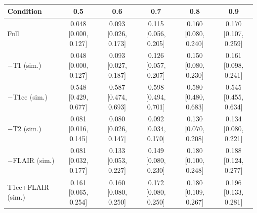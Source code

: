 \begin{tabular}{lccccc}
\toprule
Condition & 0.5 & 0.6 & 0.7 & 0.8 & 0.9 \\
\midrule
Full & 0.048 [0.000, 0.127] & 0.093 [0.026, 0.173] & 0.115 [0.056, 0.205] & 0.160 [0.080, 0.240] & 0.170 [0.107, 0.259] \\
$-$T1 (sim.) & 0.048 [0.000, 0.127] & 0.093 [0.027, 0.187] & 0.126 [0.057, 0.207] & 0.150 [0.080, 0.230] & 0.161 [0.098, 0.241] \\
$-$T1ce (sim.) & 0.548 [0.429, 0.677] & 0.587 [0.474, 0.693] & 0.598 [0.494, 0.701] & 0.580 [0.480, 0.683] & 0.545 [0.455, 0.634] \\
$-$T2 (sim.) & 0.081 [0.016, 0.145] & 0.080 [0.026, 0.147] & 0.092 [0.034, 0.170] & 0.130 [0.070, 0.208] & 0.134 [0.080, 0.221] \\
$-$FLAIR (sim.) & 0.081 [0.032, 0.177] & 0.133 [0.053, 0.227] & 0.149 [0.080, 0.230] & 0.180 [0.100, 0.248] & 0.188 [0.124, 0.277] \\
T1ce+FLAIR (sim.) & 0.161 [0.065, 0.254] & 0.160 [0.080, 0.250] & 0.172 [0.080, 0.250] & 0.180 [0.109, 0.267] & 0.196 [0.133, 0.281] \\
\bottomrule
\end{tabular}
